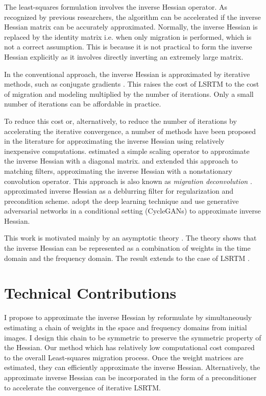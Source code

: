 The least-squares formulation involves the inverse Hessian operator. As recognized by previous researchers, the algorithm can be accelerated if the inverse Hessian matrix can be accurately approximated. Normally, the inverse Hessian is replaced by the identity matrix i.e. when only migration is performed, which is not a correct assumption. This is because it is not practical to form the inverse Hessian explicitly as it involves directly inverting an extremely large matrix.

In the conventional approach, the inverse Hessian is approximated by iterative methods, such as conjugate gradients \cite[]{tarantola,sun,xue}. This raises the cost of LSRTM to the cost of migration and modeling multiplied by the number of iterations. Only a small number of iterations can be affordable in practice. 

To reduce this cost or, alternatively, to reduce the number of iterations by accelerating the iterative convergence, a number of methods have been proposed in the literature for approximating the inverse Hessian using relatively inexpensive computations. \cite{rickett} estimated a simple scaling operator to approximate the inverse Hessian with a diagonal matrix. \cite{guitton} and \cite{greer} extended this approach to matching filters, approximating the inverse Hessian with a nonstationary convolution operator. This approach is also known as \emph{migration deconvolution} \cite[]{hu2001,yu2006}. \cite{aoki} approximated inverse Hessian as a deblurring filter for regularization and precondition scheme. \cite{kaur} adopt the deep learning technique and use generative adversarial networks in a conditional setting (CycleGANs) to approximate inverse Hessian.


This work is motivated mainly by an asymptotic theory \cite[]{miller1987,bleistein1987}. The theory shows that the inverse Hessian can be represented as a combination of weights in the time domain and the frequency domain. The result extends to the case of LSRTM \cite[]{hou15,hou16}. 

\section{Technical Contributions}

I propose to approximate the inverse Hessian by reformulate by simultaneously estimating a chain of weights in the space and frequency domains from initial images. I design this chain to be symmetric to preserve the symmetric property of the Hessian. Our method which has relatively low computational cost compared to the overall Least-squares migration process. Once the weight matrices are estimated, they can efficiently approximate the inverse Hessian. Alternatively, the approximate inverse Hessian can be incorporated in the form of a preconditioner to accelerate the convergence of iterative LSRTM.



